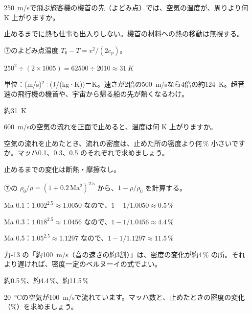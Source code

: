 \begin{reidai}[風を正面で止めると温まる]
\label{ph:熱-4:ex10}\qty{250}{m/s}で飛ぶ旅客機の機首の先（よどみ点）では、空気の温度が、周りより何 K 上がりますか。
\par{} 止めるまでに熱も仕事も出入りしない。機首の材料への熱の移動は無視する。
\par\kangaekata ⑦のよどみ点温度 $T_0-T=v^2/(2c_p)$。
\par\shiki $250^2\div(2\times1005)=\num{62500}\div2010\approx\qty{31}{K}$
\par{} 単位：(m/s)$^2$÷(J/(kg·K))＝K。速さが2倍の\qty{500}{m/s}なら4倍の約\qty{124}{K}。超音速の飛行機の機首や、宇宙から帰る船の先が熱くなるわけ。
\par\kotae 約\qty{31}{K}
\end{reidai}
\begin{jibun}
\qty{600}{m/s}の空気の流れを正面で止めると、温度は何 K 上がりますか。
\end{jibun}

\begin{reidai}[密度が変わらないとしてよい速さ]
\label{ph:熱-4:ex11}空気の流れを止めたとき、流れの密度は、止めた所の密度より何\,\% 小さいですか。マッハ0.1、0.3、0.5 のそれぞれで求めましょう。
\par{} 止めるまでの変化は断熱・摩擦なし。
\par\kangaekata ⑦の $\rho_0/\rho=(1+0.2\,\mathrm{Ma}^2)^{2.5}$ から、$1-\rho/\rho_0$ を計算する。
\par\shiki\par
Ma 0.1：$1.002^{2.5}\approx1.0050$ なので、$1-1/1.0050\approx0.5\,\%$\par
Ma 0.3：$1.018^{2.5}\approx1.0456$ なので、$1-1/1.0456\approx4.4\,\%$\par
Ma 0.5：$1.05^{2.5}\approx1.1297$ なので、$1-1/1.1297\approx11.5\,\%$
\par{} 力-13 の「約\qty{100}{m/s}（音の速さの約3割）」は、密度の変化が約4\,\% の所。それより遅ければ、密度一定のベルヌーイの式でよい。
\par\kotae 約0.5\,\%、約4.4\,\%、約11.5\,\%
\end{reidai}
\begin{jibun}
\qty{20}{\celsius}の空気が\qty{100}{m/s}で流れています。マッハ数と、止めたときの密度の変化（\%）を求めましょう。
\end{jibun}

